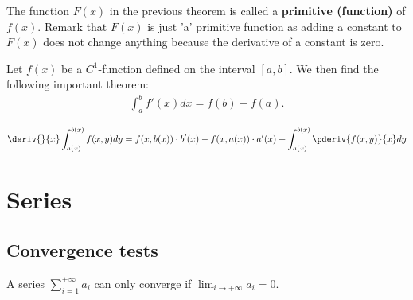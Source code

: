         \begin{remark}
		The function $F(x)$ in the previous theorem is called a \textbf{primitive (function)} of $f(x)$. Remark that $F(x)$ is just 'a' primitive function as adding a constant to $F(x)$ does not change anything because the derivative of a constant is zero.
	\end{remark}
    
    	\begin{theorem}
		Let $f(x)$ be a $C^1$-function defined on the interval $[a, b]$. We then find the following important theorem:
        	\begin{gather}
			\label{calculus:second_fundamental_theorem}
                	\int_a^bf'(x)dx = f(b) - f(a).
		\end{gather}
	\end{theorem}
        
	\begin{formula}
		\begin{gather}
			\label{calculus:diff_under_integral}
			\deriv{}{x}\int_{a(x)}^{b(x)}f(x, y)dy = f(x, b(x))\cdot b'(x) - f(x, a(x))\cdot a'(x) + \int_{a(x)}^{b(x)}\pderiv{f(x, y)}{x}dy
		\end{gather}
	\end{formula}

\section{Series}
\subsection{Convergence tests}

	\begin{remark}
		A series $\sum_{i=1}^{+\infty} a_i$ can only converge if $\lim_{i\rightarrow+\infty} a_i = 0$.
	\end{remark}

